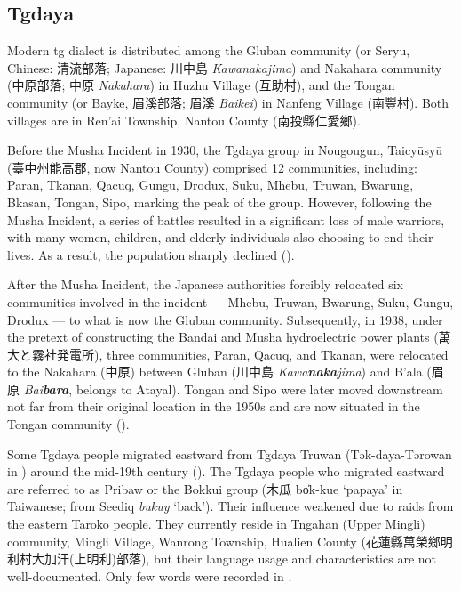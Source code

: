 \subsection{Tgdaya} \label{sec:tgintro}

Modern \acl{tg} dialect is distributed among the Gluban community (or Seryu, Chinese: 清流部落; Japanese: 川中島 \textit{Kawanakajima}) and Nakahara community (中原部落; 中原 \textit{Nakahara}) in Huzhu Village (互助村), and the Tongan community (or Bayke, 眉溪部落; 眉溪 \textit{Baikei}) in Nanfeng Village (南豐村). Both villages are in Ren'ai Township, Nantou County (南投縣仁愛鄉). 

Before the Musha Incident in 1930, the Tgdaya group in Nougougun, Taicyūsyū (臺中州能高郡, now Nantou County) comprised 12 communities, including: Paran, Tkanan, Qacuq, Gungu, Drodux, Suku, Mhebu, Truwan, Bwarung, Bkasan, Tongan, Sipo, marking the peak of the group. However, following the Musha Incident, a series of battles resulted in a significant loss of male warriors, with many women, children, and elderly individuals also choosing to end their lives. As a result, the population sharply declined (\cite{TengChian2023musha}).

After the Musha Incident, the Japanese authorities forcibly relocated six communities involved in the incident --- Mhebu, Truwan, Bwarung, Suku, Gungu, Drodux --- to what is now the Gluban community. Subsequently, in 1938, under the pretext of constructing the Bandai and Musha hydroelectric power plants (萬大と霧社発電所), three communities, Paran, Qacuq, and Tkanan, were relocated to the Nakahara (中原) between Gluban (川中島 \textit{Kawa\textbf{naka}jima}) and B'ala (眉原 \textit{Bai\textbf{bara}}, belongs to Atayal). Tongan and Sipo were later moved downstream not far from their original location in the 1950s and are now situated in the Tongan community (\cite{TengChian2023musha,iwanperin2005tongan}).

Some Tgdaya people migrated eastward from Tgdaya Truwan (Tək-daya-Tərowan in \cite{utsurikawaetal1935}) around the mid-19th century (\cite{liao1977Sedtheruy}). The Tgdaya people who migrated eastward are referred to as Pribaw or the Bokkui group (木瓜 bo̍k-kue `papaya' in Taiwanese; from Seediq \textit{bukuy} `back'). Their influence weakened due to raids from the eastern Taroko people. They currently reside in  Tngahan (Upper Mingli) community, Mingli Village, Wanrong Township, Hualien County (花蓮縣萬榮鄉明利村大加汗(上明利)部落), but their language usage and characteristics are not well-documented. Only few words were recorded in \textcite{tashiro1900easterntw}.

